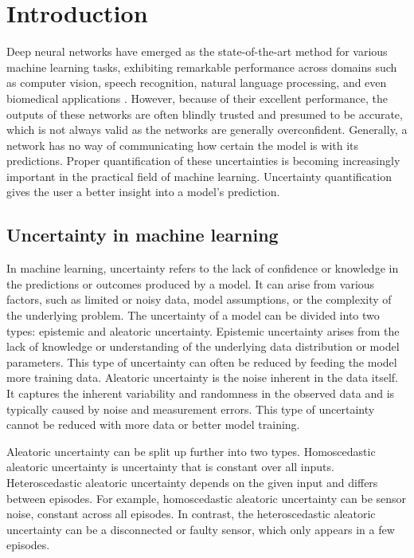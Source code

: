 \section{Introduction}\label{sec:introduction}

Deep neural networks have emerged as the state-of-the-art method for various machine learning tasks, exhibiting remarkable performance across domains such as computer vision, speech recognition, natural language processing, and even biomedical applications \citep{yoo2015deep, zheng2015investigating}. However, because of their excellent performance, the outputs of these networks are often blindly trusted and presumed to be accurate, which is not always valid as the networks are generally overconfident. Generally, a network has no way of communicating how certain the model is with its predictions. Proper quantification of these uncertainties is becoming increasingly important in the practical field of machine learning. Uncertainty quantification gives the user a better insight into a model's prediction.

\subsection{Uncertainty in machine learning}

In machine learning, uncertainty refers to the lack of confidence or knowledge in the predictions or outcomes produced by a model. It can arise from various factors, such as limited or noisy data, model assumptions, or the complexity of the underlying problem. The uncertainty of a model can be divided into two types: epistemic and aleatoric uncertainty. Epistemic uncertainty arises from the lack of knowledge or understanding of the underlying data distribution or model parameters. This type of uncertainty can often be reduced by feeding the model more training data. Aleatoric uncertainty is the noise inherent in the data itself. It captures the inherent variability and randomness in the observed data and is typically caused by noise and measurement errors. This type of uncertainty cannot be reduced with more data or better model training.

Aleatoric uncertainty can be split up further into two types. Homoscedastic aleatoric uncertainty is uncertainty that is constant over all inputs. Heteroscedastic aleatoric uncertainty depends on the given input and differs between episodes. For example, homoscedastic aleatoric uncertainty can be sensor noise, constant across all episodes. In contrast, the heteroscedastic aleatoric uncertainty can be a disconnected or faulty sensor, which only appears in a few episodes.

